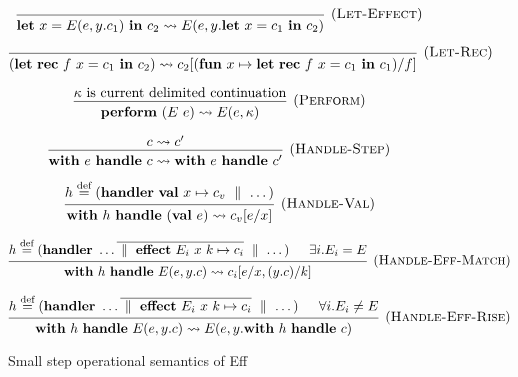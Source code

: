 \documentclass[class=article, crop=false]{standalone}
\begin{document}
\begin{figure}[H]
    $$
    \begin{prooftree}
      \hypo{}
      \infer1[(\textsc{Let-Effect})]{\effLet x = E(e, y.c_1) \effIn c_2 \leadsto E(e, y.\effLet x = c_1 \effIn c_2)}
    \end{prooftree}
    $$
    
    $$
    \begin{prooftree}
      \hypo{}
      \infer1[(\textsc{Let-Rec})]{\left ( \effLet \effRec f\ x = c_1 \effIn c_2\right ) \leadsto c_2[(\effFun x \mapsto \effLet \effRec f\ x = c_1 \effIn c_1)/f]}
    \end{prooftree}
    $$
    
    $$
    \begin{prooftree}
      \hypo{\kappa \text{ is current delimited continuation}}
      \infer1[(\textsc{Perform})]{\effPerform (E\ e) \leadsto E(e, \kappa)}
    \end{prooftree}
    $$
    
    $$
    \begin{prooftree}
      \hypo{c \leadsto c'}
      \infer1[(\textsc{Handle-Step})]{\effWith e \effHandle c \leadsto \effWith e \effHandle c'}
    \end{prooftree}
    $$
    
    $$
    \begin{prooftree}
      \hypo{h \stackrel{\text{def}}{=} (\effHandler \effVal x \mapsto c_v \dmid \dots)}
      \infer1[(\textsc{Handle-Val})]{\effWith h \effHandle (\effVal e) \leadsto c_v[e/x]}
    \end{prooftree}
    $$
    
    $$
    \begin{prooftree}
      \hypo{h \stackrel{\text{def}}{=} (\effHandler \dots \overline{\dmid \effEffect E_i\ x\ k \mapsto c_i} \dmid \dots)}
      \hypo{\exists i. E_i = E}
      \infer2[(\textsc{Handle-Eff-Match})]{\effWith h \effHandle E(e, y.c) \leadsto c_i[e/x, (y.c)/k]}
    \end{prooftree}
    $$
    
    $$
    \begin{prooftree}
      \hypo{h \stackrel{\text{def}}{=} (\effHandler \dots \overline{\dmid \effEffect E_i\ x\ k \mapsto c_i} \dmid \dots)}
      \hypo{\forall i. E_i \neq E}
      \infer2[(\textsc{Handle-Eff-Rise})]{\effWith h \effHandle E(e, y.c) \leadsto E( e, y. \effWith h \effHandle c)}
    \end{prooftree}
    $$
    
    \caption{Small step operational semantics of Eff}
    \label{fig:full-semantics}
    \end{figure}
\end{document}
